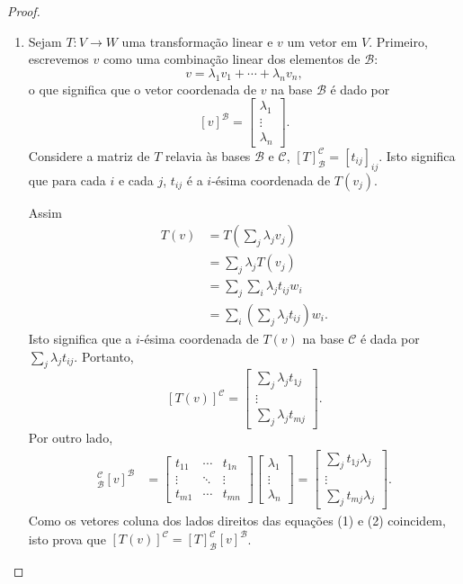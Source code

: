 \begin{proof}
	\begin{enumerate}
		\item Sejam $T\colon V\to W$ uma transformação linear e $v$ um vetor em $V$. Primeiro, escrevemos $v$ como uma combinação linear dos elementos de $\mathcal{B}$:
		\[v=\lambda_1 v_1+\cdots+\lambda_n v_n,\]
		o que significa que o vetor coordenada de $v$ na base $\mathcal{B}$ é dado por
		\[[v]^{\mathcal{B}}=\begin{bmatrix}\lambda_1\\\vdots\\\lambda_n\end{bmatrix}.\]
		Considere a matriz de $T$ relavia às bases $\mathcal{B}$ e $\mathcal{C}$, $[T]_{\mathcal{B}}^{\mathcal{C}}=[t_{ij}]_{ij}$. Isto significa que para cada $i$ e cada $j$, $t_{ij}$ é a $i$-ésima coordenada de $T(v_j)$.
		
		Assim
		\begin{align*}
			T(v)
				&=T\left(\sum_j\lambda_j v_j\right)\\
				&=\sum_j\lambda_j T(v_j)\\
				&=\sum_j\sum_i\lambda_j t_{ij}w_i\\
				&=\sum_i\left(\sum_j \lambda_j t_{ij}\right)w_i.
		\end{align*}
		Isto significa que a $i$-ésima coordenada de $T(v)$ na base $\mathcal{C}$ é dada por $\sum_j\lambda_j t_{ij}$. Portanto,
		\[[T(v)]^{\mathcal{C}}=\begin{bmatrix}\sum_j\lambda_j t_{1j}\\\vdots\\\sum_j\lambda_j t_{mj}\end{bmatrix}.\tag{1}\]
		Por outro lado,
		\begin{align*}
		[T]_{\mathcal{B}}^{\mathcal{C}}[v]^{\mathcal{B}}
			&=\begin{bmatrix}t_{11}&\cdots&t_{1n}\\\vdots&\ddots&\vdots\\t_{m1}&\cdots&t_{mn}\end{bmatrix}\begin{bmatrix}\lambda_1\\\vdots\\\lambda_n\end{bmatrix}=\begin{bmatrix}\sum_j t_{1j}\lambda_j\\\vdots\\\sum_j t_{mj}\lambda_j\end{bmatrix}.\tag{2}
		\end{align*}
		Como os vetores coluna dos lados direitos das equações (1) e (2) coincidem, isto prova que $[T(v)]^{\mathcal{C}}=[T]_{\mathcal{B}}^{\mathcal{C}}[v]^{\mathcal{B}}$.
		

\end{enumerate}
\end{proof}
